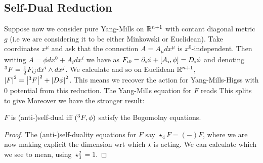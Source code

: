 \documentclass{article}
\begin{document}
\subsection{Self-Dual Reduction}
Suppose now we consider pure Yang-Mills on $\mathbb{R}^{n+1}$ with contant diagonal metric $g$ (i.e we are considering it to be either Minkowski or Euclidean). Take coordinates $x^\mu$ and ask that the connection $A = A_\mu dx^\mu$ is $x^0$-independent. Then writing $A = \phi dx^0 + A_i dx^i$ we have 
as $F_{i0} = \partial_i \phi + \left[ A_i, \phi \right] = D_i \phi$ and denoting $\indices{^3}F = \frac{1}{2}F_{ij} dx^i \wedge dx^j$. We calculate
and so on Euclidean $\mathbb{R}^{n+1}$, $\abs{F}^2 = \abs{\indices{^3}F}^2 + \abs{D\phi}^2 $. This means we recover the action for Yang-Mills-Higss with $0$ potential from this reduction. The Yang-Mills equation for $F$ reads 
This splits to give 
Moreover we have the stronger result:
\begin{prop}
	$F$ is (anti-)self-dual iff $(\indices{^3}F,\phi)$ satisfy the Bogomolny equations. 
\end{prop}
\begin{proof}
	The (anti-)self-duality equations for $F$ say $\star_4 F = (-)F$, where we are now making explicit the dimension wrt which $\star$ is acting. We can calculate 
which we see to mean, using $\star_3^2=1$.  
\end{proof}
\end{document}
